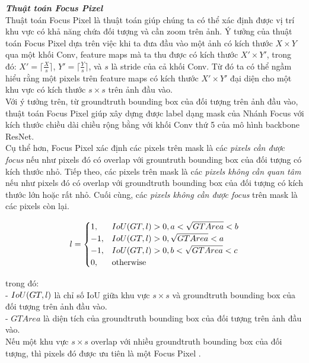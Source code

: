 {    \noindent
    \textbf{\textit{Thuật toán Focus Pixel}} \\
    Thuật toán Focus Pixel  là thuật toán giúp chúng ta có thể xác định được vị trí khu vực có khả năng chứa đối tượng và cần zoom trên ảnh.
    Ý tưởng của thuật toán Focus Pixel  dựa trên việc khi ta đưa đầu vào một ảnh có kích thước $X \times Y$ qua một khối Conv, feature maps  mà ta thu được có kích thước $X' \times Y'$, trong đó: $X' = \lceil \frac{X}{s} \rceil$, $Y' = \lceil \frac{Y}{s} \rceil$, và $s$ là stride của cả khối Conv.
    Từ đó ta có thể ngầm hiểu rằng một pixels  trên feature maps  có kích thước $X' \times Y'$ đại diện cho một khu vực có kích thước $s \times s$ trên ảnh đầu vào. \\
    Với ý tưởng trên, từ groundtruth  bounding box  của đối tượng trên ảnh đầu vào, thuật toán Focus Pixel  giúp xây dựng được label dạng mask của Nhánh Focus  với kích thước chiều dài chiều rộng bằng với khối Conv  thứ 5 của mô hình backbone ResNet. \\
    Cụ thể hơn, Focus Pixel  xác định các pixels  trên mask là các \textit{pixels  cần được focus} nếu như pixels  đó có overlap với grountruth bounding box  của đối tượng có kích thước nhỏ.
    Tiếp theo, các pixels  trên mask là các \textit{pixels  không cần quan tâm} nếu như pixels  đó có overlap với groundtruth  bounding box  của đối tượng có kích thước lớn hoặc rất nhỏ.
    Cuối cùng, các \textit{pixels  không cần được focus} trên mask là các pixels  còn lại.

    \[l = 
        \begin{cases}
            1, & IoU \index{IoU}(GT, l) > 0, a < \sqrt{GTArea} < b \\
            -1, & IoU \index{IoU}(GT, l) > 0, \sqrt{GTArea} < a  \\
            -1, & IoU \index{IoU}(GT, l) > 0, b < \sqrt{GTArea} < c  \\
            0, & \text{otherwise}
        \end{cases}
    \]

    \noindent
    trong đó: \\
    - $IoU \index{IoU}(GT, l)$ là chỉ số IoU  giữa khu vực $s \times s$ và groundtruth  bounding box  của đối tượng trên ảnh đầu vào. \\
    - $GTArea$ là diện tích của groundtruth  bounding box  của đối tượng trên ảnh đầu vào. \\
    Nếu một khu vực $s \times s$ overlap với nhiều groundtruth  bounding box  của đối tượng, thì pixels  đó được ưu tiên là một Focus Pixel .

}
